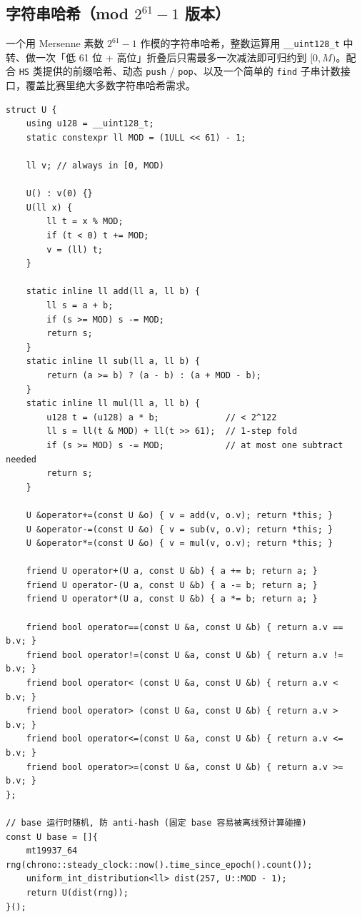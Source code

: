 		\subsection[\tochl{字符串哈希（mod $2^{61}-1$ 版本）}]{字符串哈希（mod $2^{61}-1$ 版本）}

		一个用 Mersenne 素数 $2^{61}-1$ 作模的字符串哈希，整数运算用 \verb|__uint128_t| 中转、做一次「低 61 位 + 高位」折叠后只需最多一次减法即可归约到 $[0, M)$。配合 \verb|HS| 类提供的前缀哈希、动态 \verb|push| / \verb|pop|、以及一个简单的 \verb|find| 子串计数接口，覆盖比赛里绝大多数字符串哈希需求。

		\begin{verbatim}
struct U {
	using u128 = __uint128_t;
	static constexpr ll MOD = (1ULL << 61) - 1;

	ll v; // always in [0, MOD)

	U() : v(0) {}
	U(ll x) {
		ll t = x % MOD;
		if (t < 0) t += MOD;
		v = (ll) t;
	}

	static inline ll add(ll a, ll b) {
		ll s = a + b;
		if (s >= MOD) s -= MOD;
		return s;
	}
	static inline ll sub(ll a, ll b) {
		return (a >= b) ? (a - b) : (a + MOD - b);
	}
	static inline ll mul(ll a, ll b) {
		u128 t = (u128) a * b;             // < 2^122
		ll s = ll(t & MOD) + ll(t >> 61);  // 1-step fold
		if (s >= MOD) s -= MOD;            // at most one subtract needed
		return s;
	}

	U &operator+=(const U &o) { v = add(v, o.v); return *this; }
	U &operator-=(const U &o) { v = sub(v, o.v); return *this; }
	U &operator*=(const U &o) { v = mul(v, o.v); return *this; }

	friend U operator+(U a, const U &b) { a += b; return a; }
	friend U operator-(U a, const U &b) { a -= b; return a; }
	friend U operator*(U a, const U &b) { a *= b; return a; }

	friend bool operator==(const U &a, const U &b) { return a.v == b.v; }
	friend bool operator!=(const U &a, const U &b) { return a.v != b.v; }
	friend bool operator< (const U &a, const U &b) { return a.v <  b.v; }
	friend bool operator> (const U &a, const U &b) { return a.v >  b.v; }
	friend bool operator<=(const U &a, const U &b) { return a.v <= b.v; }
	friend bool operator>=(const U &a, const U &b) { return a.v >= b.v; }
};

// base 运行时随机, 防 anti-hash (固定 base 容易被离线预计算碰撞)
const U base = []{
	mt19937_64 rng(chrono::steady_clock::now().time_since_epoch().count());
	uniform_int_distribution<ll> dist(257, U::MOD - 1);
	return U(dist(rng));
}();


\end{verbatim}
